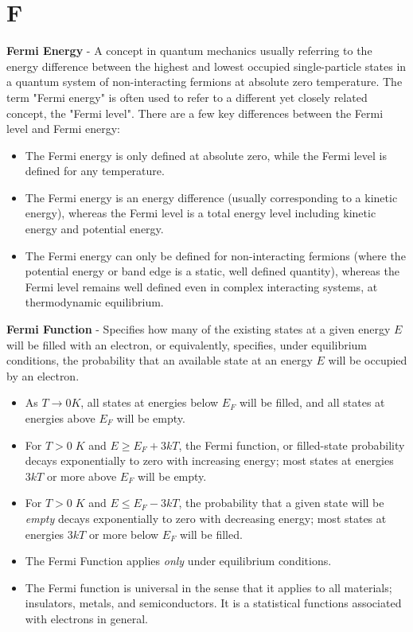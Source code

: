 \section{F}
    \textbf{Fermi Energy} - A concept in quantum mechanics usually referring to the energy difference between the highest and lowest occupied single-particle states in a quantum system of non-interacting fermions at absolute zero temperature.
    The term "Fermi energy" is often used to refer to a different yet closely related concept, the "Fermi level".  There are a few key differences between the Fermi level and Fermi energy:
    \vspace{0.15cm}
    \begin{itemize}
        \setlength\itemsep{0.5em}
        \item{The Fermi energy is only defined at absolute zero, while the Fermi level is defined for any temperature.}
        \item{The Fermi energy is an energy difference (usually corresponding to a kinetic energy), whereas the Fermi level is a total energy level including kinetic energy and potential energy.}
        \item{The Fermi energy can only be defined for non-interacting fermions (where the potential energy or band edge is a static, well defined quantity), whereas the Fermi level remains well defined even in complex interacting systems, at thermodynamic equilibrium.}
    \end{itemize}
\vspace{0.5cm}
    \textbf{Fermi Function} - Specifies how many of the existing states at a given energy $E$ will be filled with an electron, or equivalently, specifies, under equilibrium conditions, the probability that an available state at an energy $E$ will be occupied by an electron.
    \vspace{0.15cm}
    \begin{itemize}
        \setlength\itemsep{0.5em}
        \item{As $T \to 0K$}, all states at energies below $E_F$  will be filled, and all states at energies above $E_F$ will be empty.
        \item{For $T > 0\;K$ and $E \geq E_F + 3kT$, the Fermi function, or filled-state probability decays exponentially to zero with increasing energy; most states at energies $3kT$ or more above $E_F$ will be empty.}
        \item{For $T > 0\;K$ and $E \leq E_F - 3kT$, the probability that a given state will be \emph{empty} decays exponentially to zero with decreasing energy; most states at energies $3kT$ or more below $E_F$ will be filled.}
        \item{The Fermi Function applies \emph{only} under equilibrium conditions.}
        \item{The Fermi function is universal in the sense that it applies to all materials; insulators, metals, and semiconductors.  It is a statistical functions associated with electrons in general.}
    \end{itemize}
